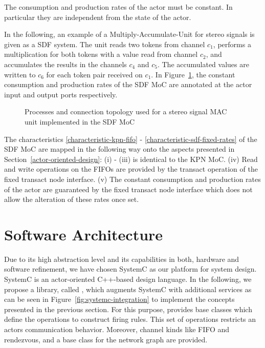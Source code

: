\begin{characteristic}\label{characteristic-sdf-fixed-rates}
The consumption and production rates of the actor must be constant.
In particular they are independent from the state of the actor.
\end{characteristic}

In the following, an example of a Multiply-Accumulate-Unit for stereo signals is given
as a SDF system. The unit reads two tokens from channel $c_1$,
performs a multiplication for both tokens with a value read from channel $c_2$,
and accumulates the results in the channels $c_4$ and
$c_5$. The accumulated values are written to $c_6$ for each
token pair received on $c_1$.
In Figure~\ref{fig:sdf-mac-unit},
the constant consumption and production rates of the SDF
MoC are annotated at the actor input and output ports
respectively.

\begin{figure}[h]
\centering

\caption{Processes and connection topology used for a stereo signal MAC
  unit implemented in the SDF MoC}
\label{fig:sdf-mac-unit}
\end{figure}

The characteristics \ref{characteristic-kpn-fifo} -
\ref{characteristic-sdf-fixed-rates} of the SDF MoC are mapped in the following way
onto the aspects presented in Section~\ref{actor-oriented-design}: (i) - (iii) is identical
to the KPN MoC.
(iv) Read and write operations on the FIFOs are provided by the transact
operation of the fixed transact node interface.
(v) The constant consumption and production rates of the actor are
guaranteed by the fixed transact node interface which does
not allow the alteration of these rates once set.


\section{Software Architecture}\label{software-architecture}

Due to its high abstraction level and its capabilities in both,
hardware and software refinement, we have chosen SystemC
\cite{systemc-lrm:2003,glms:2002} as our platform for system design.
SystemC is an actor-oriented C++-based design language.
In the following, we propose a library, called \SysteMoC{},
which augments SystemC with additional services as can be seen in
Figure~\ref{fig:systemc-integration} to implement
the concepts presented in the previous section. For this purpose,
\SysteMoC{} provides base classes which define the operations
to construct firing rules. This set of operations restricts
an actors communication behavior. Moreover, channel kinds like
FIFO and rendezvous, and a base class for the network graph are
provided.

